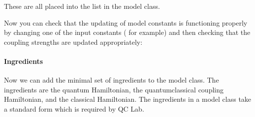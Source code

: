 \documentclass[letterpaper,10pt,english]{sphinxmanual}
\begin{document}
\begin{sphinxVerbatim}[commandchars=\\\{\}]
 
\end{sphinxVerbatim}

\sphinxAtStartPar
These are all placed into the  list in the model class.

\begin{sphinxVerbatim}[commandchars=\\\{\}]
  \PYG{p}{[}
\PYG{p}{]}
\end{sphinxVerbatim}

\sphinxAtStartPar
Now you can check that the updating of model constants is functioning properly by changing one of the input constants ( for example) and then checking that
the coupling strengths are updated appropriately:

\begin{sphinxVerbatim}[commandchars=\\\{\}]
  
  
   
  
   
\end{sphinxVerbatim}


\paragraph{Ingredients}
\label{\detokenize{user_guide/model_dev:ingredients}}
\sphinxAtStartPar
Now we can add the minimal set of ingredients to the model class. The ingredients are the quantum Hamiltonian,
the quantum\sphinxhyphen{}classical coupling Hamiltonian, and the classical Hamiltonian. The ingredients in a model class
take a standard form which is required by QC Lab.
\end{document}
